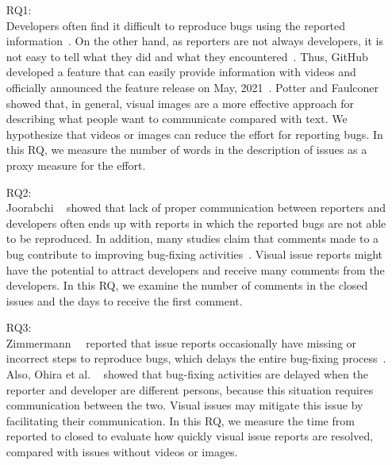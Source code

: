 \begin{itemize}
	\item[RQ1:] \textbf{\RQone{}}\\
	Developers often find it difficult to reproduce bugs using the reported information~\citep{DBLP:conf/sigsoft/ChaparroLZMPMBN17}\citep{DBLP:conf/icsm/0001KC20}\citep{zimmermann2010TSE}. 
	On the other hand, as reporters are not always developers, it is not easy to tell what they did and what they encountered~\citep{DBLP:conf/sigsoft/ChaparroBLMMPPN19}. Thus, GitHub developed a feature that can easily provide information with videos and officially announced the feature release on May, 2021~\citep{github-video-blog}. Potter and Faulconer~\citep{POTTER1975} showed that, in general, visual images are a more effective approach for describing what people want to communicate compared with text. 
	We hypothesize that videos or images can reduce the effort for reporting bugs. In this RQ, we measure the number of words in the description of issues as a proxy measure for the effort. 
	\item[RQ2:] \textbf{\RQtwo{}}\\
	Joorabchi \et~\citep{DBLP:conf/msr/JoorabchiMM14} showed that lack of proper communication between reporters and developers often ends up with reports in which the reported bugs are not able to be reproduced. In addition, many studies claim that comments made to a bug contribute to improving bug-fixing activities~\citep{DBLP:conf/icse/GigerPG10}\citep{DBLP:conf/msr/Panjer07}\citep{zhang2012WCRE}.  Visual issue reports might have the potential to attract developers and receive many comments from the developers. In this RQ, we examine the number of comments in the closed issues and the days to receive the first comment.
	\item[RQ3:] \textbf{\RQthree{}}\\
	Zimmermann~\et~\citep{zimmermann2010TSE} reported that issue reports occasionally have missing or incorrect steps to reproduce bugs, which delays the entire bug-fixing process~\citep{github-video-blog}. Also, Ohira et al. ~\citep{DBLP:conf/icsm/OhiraHOM12} showed that bug-fixing activities are delayed when the reporter and developer are different persons,  because this situation requires communication between the two.  Visual issues may mitigate this issue by facilitating their communication. In this RQ, we measure the time from reported to closed to evaluate how quickly visual issue reports are resolved, compared with issues without videos or images. 
\end{itemize}

